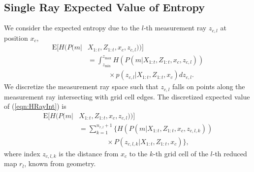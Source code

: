 \documentclass[letterpaper, 10pt, conference]{ieeeconf}
\newcommand{\refeqn}[1]{(\ref{eqn:#1})}
\begin{document}
\subsection{Single Ray Expected Value of Entropy}
We consider the expected entropy due to the $l$-th measurement ray $z_{c,l}$ at position $x_c$,
\begin{align}
\label{eqn:HRayInt}
\text{E}[H(P(m|&X_{1:t},Z_{1:t},x_c,z_{c,l}))]
\nonumber\\&
=\int_{z_\text{min}}^{z_\text{max}}
H(P(m|X_{1:t},Z_{1:t},x_c,z_{c,l}))\nonumber\\&\qquad\quad\times p(z_{c,l}|X_{1:t},Z_{1:t},x_c)
dz_{c,l}.
\end{align}
We discretize the measurement ray space such that $z_{c,l}$ falls on points along the measurement ray intersecting with grid cell edges.
The discretized expected value of \refeqn{HRayInt} is
\begin{align}
\label{eqn:DiscExpEntropyRay}
\text{E}[H(P(m|&X_{1:t},Z_{1:t},x_c,z_{c,l}))]
\nonumber\\&=\sum_{k=1}^{n_{r,l}+1}\bigg\{H(P(m|X_{1:t},Z_{1:t},x_c,z_{c,l,k}))\nonumber\\&\qquad\qquad\times P(z_{c,l,k}|X_{1:t},Z_{1:t},x_c)\bigg\},
\end{align}
where index $z_{c,l,k}$ is the distance from $x_c$ to the $k$-th grid cell of the $l$-th reduced map $r_l$, known from geometry.
\end{document}
